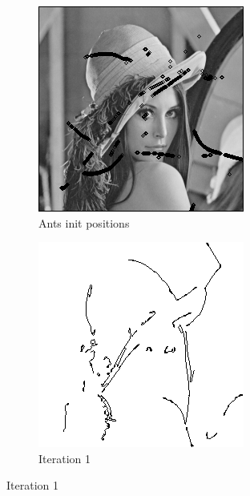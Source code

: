 \documentclass{llncs}
\begin{document}
	\begin{figure}
        \centering
        \begin{subfigure}[b]{0.3\textwidth}
                \includegraphics[width=\textwidth]{IMG/ImprovedSearch/Initialization}
                \caption{Ants init positions}
                \label{fig:search_init}
        \end{subfigure}%
        \qquad
        \begin{subfigure}[b]{0.3\textwidth}
                \includegraphics[width=\textwidth]{IMG/ImprovedSearch/Iteration1}
                \caption{Iteration 1}
                \label{fig:search_iter1}
        \end{subfigure}
        

\end{figure}
\end{document}
